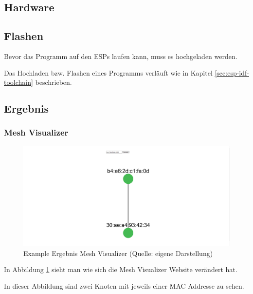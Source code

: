 \subsection{Hardware}

\subsection{Flashen}

Bevor das Programm auf den ESPs laufen kann, muss es hochgeladen werden.

Das Hochladen bzw. Flashen eines Programms verläuft wie in Kapitel \ref{sec:esp-idf-toolchain} beschrieben.

\subsection{Ergebnis}\label{sec:example-result}
\subsubsection{Mesh Visualizer}

\begin{figure}[H]
    \begin{center}
        \includegraphics[scale=0.3]{images/example_result_mesh_visualizer.png}
        \caption{Example Ergebnis Mesh Visualizer (Quelle: eigene Darstellung)}
        \label{abb:example_result_mesh_visualizer}
    \end{center}
\end{figure}

In Abbildung \ref{abb:example_result_mesh_visualizer} sieht man wie sich die Mesh Visualizer Website verändert hat.

In dieser Abbildung sind zwei Knoten mit jeweils einer MAC Addresse zu sehen.

